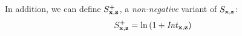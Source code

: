 \begin{itemize}
In addition, we can define $S^+_{\mathbf{x},\mathbf{z}}$, a \emph{non-negative} 
variant of $S_{\mathbf{x},\mathbf{z}}$:
\begin{align}
S^+_{\mathbf{x},\mathbf{z}} & = \ln \left( 1 + \mathit{Int}_{\mathbf{x},\mathbf{z}} \right)
\end{align}
\end{itemize}

%

%
%

